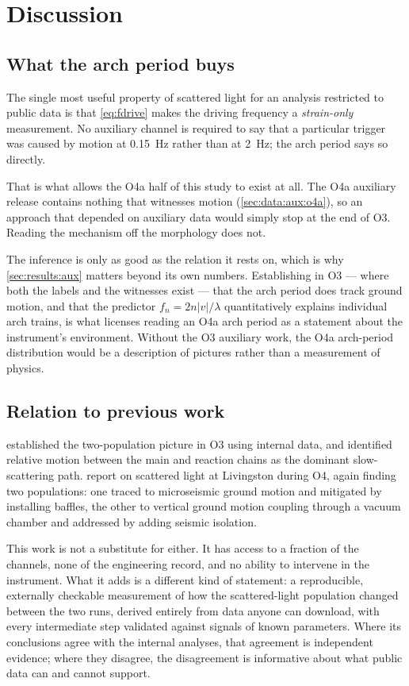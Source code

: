 \section{Discussion}
\label{sec:discussion}

\subsection{What the arch period buys}

The single most useful property of scattered light for an analysis restricted
to public data is that \cref{eq:fdrive} makes the driving frequency a
\emph{strain-only} measurement. No auxiliary channel is required to say that a
particular trigger was caused by motion at \SI{0.15}{\hertz} rather than at
\SI{2}{\hertz}; the arch period says so directly.

That is what allows the O4a half of this study to exist at all. The O4a
auxiliary release contains nothing that witnesses motion
(\cref{sec:data:aux:o4a}), so an approach that depended on auxiliary data
would simply stop at the end of O3. Reading the mechanism off the morphology
does not.

The inference is only as good as the relation it rests on, which is why
\cref{sec:results:aux} matters beyond its own numbers. Establishing in O3 ---
where both the labels and the witnesses exist --- that the arch period does
track ground motion, and that the predictor $f_n = 2n|v|/\lambda$ quantitatively
explains individual arch trains, is what licenses reading an O4a arch period
as a statement about the instrument's environment. Without the O3 auxiliary
work, the O4a arch-period distribution would be a description of pictures
rather than a measurement of physics.

\subsection{Relation to previous work}

\citet{Soni2021Scattering} established the two-population picture in O3 using
internal data, and identified relative motion between the main and reaction
chains as the dominant slow-scattering path. \citet{Nandi2026} report on
scattered light at Livingston during O4, again finding two populations: one
traced to microseismic ground motion and mitigated by installing baffles, the
other to vertical ground motion coupling through a vacuum chamber and
addressed by adding seismic isolation.

This work is not a substitute for either. It has access to a fraction of the
channels, none of the engineering record, and no ability to intervene in the
instrument. What it adds is a different kind of statement: a reproducible,
externally checkable measurement of how the scattered-light population changed
between the two runs, derived entirely from data anyone can download, with
every intermediate step validated against signals of known parameters. Where
its conclusions agree with the internal analyses, that agreement is
independent evidence; where they disagree, the disagreement is informative
about what public data can and cannot support.

